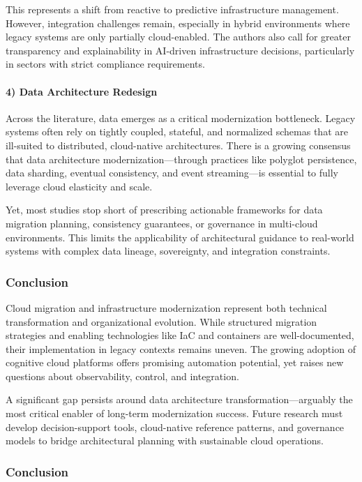 \documentclass[12pt]{article}
\begin{document}
This represents a shift from reactive to predictive infrastructure management. However, integration challenges remain, especially in hybrid environments where legacy systems are only partially cloud-enabled. The authors also call for greater transparency and explainability in AI-driven infrastructure decisions, particularly in sectors with strict compliance requirements.

\paragraph{4) Data Architecture Redesign}

Across the literature, data emerges as a critical modernization bottleneck. Legacy systems often rely on tightly coupled, stateful, and normalized schemas that are ill-suited to distributed, cloud-native architectures. There is a growing consensus that data architecture modernization—through practices like polyglot persistence, data sharding, eventual consistency, and event streaming—is essential to fully leverage cloud elasticity and scale.

Yet, most studies stop short of prescribing actionable frameworks for data migration planning, consistency guarantees, or governance in multi-cloud environments. This limits the applicability of architectural guidance to real-world systems with complex data lineage, sovereignty, and integration constraints.

\subsubsection{Conclusion}

Cloud migration and infrastructure modernization represent both technical transformation and organizational evolution. While structured migration strategies and enabling technologies like IaC and containers are well-documented, their implementation in legacy contexts remains uneven. The growing adoption of cognitive cloud platforms offers promising automation potential, yet raises new questions about observability, control, and integration.

A significant gap persists around data architecture transformation—arguably the most critical enabler of long-term modernization success. Future research must develop decision-support tools, cloud-native reference patterns, and governance models to bridge architectural planning with sustainable cloud operations.


\subsubsection{Conclusion}
\end{document}
